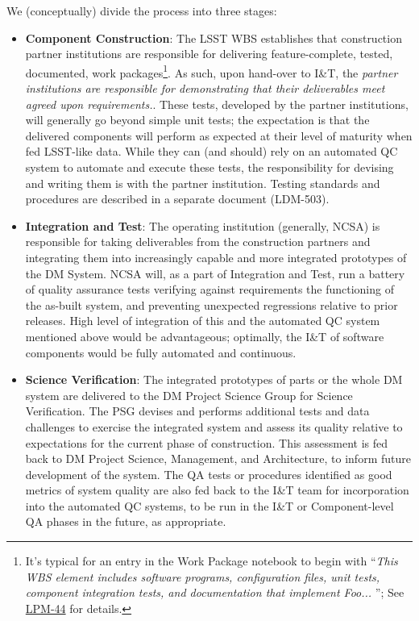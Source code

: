 We (conceptually) divide the process into three stages:
%
\begin{itemize}

\item {\bf Component Construction}: The LSST WBS establishes that construction
partner institutions are responsible for delivering feature-complete,
tested, documented, work packages\footnote{It's typical for an entry in the
Work Package notebook to begin with ``{\em This WBS element includes
software programs, configuration files, unit tests, component integration
tests, and documentation that implement Foo...  }''; See
\href{http://ls.st/LPM-44)}{LPM-44} for details.}.  As such, upon hand-over
to I\&T, the {\em partner institutions are responsible for demonstrating
that their deliverables meet agreed upon requirements.}.  These tests,
developed by the partner institutions, will generally go beyond simple unit
tests; the expectation is that the delivered components will perform as expected
at their level of maturity when fed LSST-like data.  While they can
(and should) rely on an automated QC system to automate and execute these
tests, the responsibility for devising and writing them is with the partner
institution. Testing standards and procedures are described in a separate
document (LDM-503).

\item {\bf Integration and Test}: The operating institution (generally,
NCSA) is responsible for taking deliverables from the construction partners
and integrating them into increasingly capable and more integrated
prototypes of the DM System.  NCSA will, as a part of Integration and Test,
run a battery of quality assurance tests verifying against requirements the
functioning of the as-built system, and preventing unexpected regressions
relative to prior releases.  High level of integration of this and the
automated QC system mentioned above would be advantageous; optimally, the
I\&T of software components would be fully automated and continuous.

\item {\bf Science Verification}: The integrated prototypes of parts or the
whole DM system are delivered to the DM Project Science Group for Science
Verification.  The PSG devises and performs additional tests and data
challenges to exercise the integrated system and assess its quality relative to
expectations for the current phase of construction.  This assessment is
fed back to DM Project Science, Management, and Architecture, to inform
future development of the system.  The QA tests or procedures identified
as good metrics of system quality are also fed back to the I\&T team for
incorporation into the automated QC systems, to be run in the I\&T or
Component-level QA phases in the future, as appropriate.

\end{itemize}


